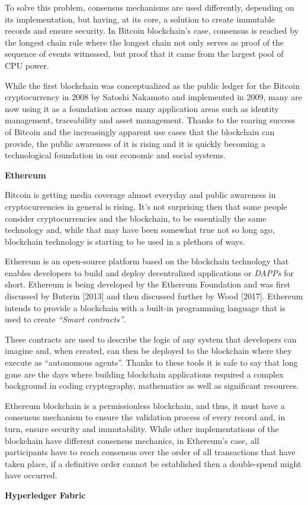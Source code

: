 \documentclass[notitlepage]{llncs}
\begin{document}
\par
To solve this problem, consensus mechanisms are used differently, depending on its implementation, but having, at its core, a solution to create immutable records and ensure security. In Bitcoin blockchain’s case, consensus is reached by the longest chain rule where the longest chain not only serves as proof of the sequence of events witnessed, but proof that it came from the largest pool of CPU power.\cite{Baars2016}
\par
While the first blockchain was conceptualized as the public ledger for the Bitcoin cryptocurrency in 2008 by Satoshi Nakamoto and implemented in 2009, many are now using it as a foundation across many application areas such as identity management, traceability and asset management. Thanks to the roaring success of Bitcoin and the increasingly apparent use cases that the blockchain can provide, the public awareness of it is rising and it is quickly becoming a technological foundation in our economic and social systems.
\par
\vspace{10pt}
\textbf{Ethereum}
\vspace{6pt}

Bitcoin is getting media coverage almost everyday and public awareness in cryptocurrencies in general is rising. It’s not surprising then that some people consider cryptocurrencies and the blockchain, to be essentially the same technology and, while that may have been somewhat true not so long ago, blockchain technology is starting to be used in a plethora of ways.
\par
Ethereum is an open-source platform based on the blockchain technology that enables developers to build and deploy decentralized applications or \textit{DAPPs} for short.
Ethereum is being developed by the Ethereum Foundation and was first discussed by Buterin [2013] and then discussed further by Wood [2017]. Ethereum intends to provide a blockchain with a built-in programming language that is used to create \textit{“Smart contracts”}.
\cite{Wood2017}
\par
These contracts are used to describe the logic of any system that developers can imagine and, when created, can then be deployed to the blockchain where they execute as “autonomous agents”. Thanks to these tools it is safe to say that long gone are the days where building blockchain applications required a complex background in coding cryptography, mathematics as well as significant resources.\cite{Wood2017,BlockGeeks2017}
\par
Ethereum blockchain is a permissionless blockchain, and thus, it must have a consensus mechanism to ensure the validation process of every record and, in turn, ensure security and immutability. While other implementations of the blockchain have different consensus mechanics, in Ethereum’s case, all participants have to reach consensus over the order of all transactions that have taken place, if a definitive order cannot be established then a double-spend might have occurred.
\par
\vspace{10pt}
\textbf{Hyperledger Fabric}
\vspace{6pt}
\end{document}
